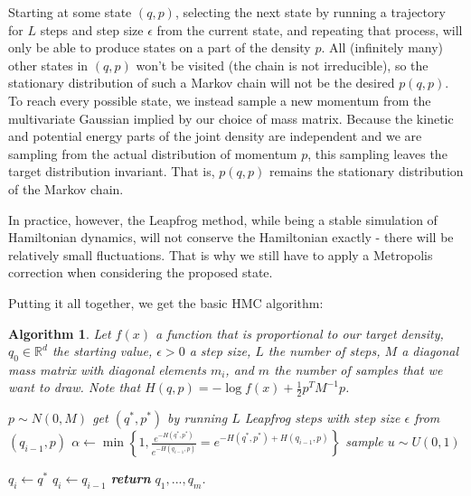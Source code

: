 \documentclass{book}
\theoremstyle{plain}%
\newtheorem{algo}{Algorithm}[section]
\theoremstyle{definition}
\begin{document}
Starting at some state $(q, p)$, selecting the next state by running a trajectory for $L$ steps and step size $\epsilon$ from the current state, and repeating that process, will only be able to produce states on a part of the density $p$. All (infinitely many) other states in $(q, p)$ won't be visited (the chain is not irreducible), so the stationary distribution of such a Markov chain will not be the desired $p(q, p)$. To reach every possible state, we instead sample a new momentum from the multivariate Gaussian implied by our choice of mass matrix. Because the kinetic and potential energy parts of the joint density are independent and we are sampling from the actual distribution of momentum $p$, this sampling leaves the target distribution invariant. That is, $p(q, p)$ remains the stationary distribution of the Markov chain.

In practice, however, the Leapfrog method, while being a stable simulation of Hamiltonian dynamics, will not conserve the Hamiltonian exactly - there will be relatively small fluctuations. That is why we still have to apply a Metropolis correction when considering the proposed state.

Putting it all together, we get the basic HMC algorithm:

\begin{algo}
Let $f(x)$ a function that is proportional to our target density, $q_0 \in \mathbb{R}^d$ the starting value, $\epsilon > 0$ a step size, $L$ the number of steps, $M$ a diagonal mass matrix with diagonal elements $m_i$, and $m$ the number of samples that we want to draw. Note that $H(q, p) = -\log f(x) + \frac{1}{2}p^T M^{-1}p$.
\begin{algorithmic}[1]
 
\State $p \sim N(0, M)$ 
\State get $(q^*, p^*)$ by running $L$ Leapfrog steps with step size $\epsilon$ from $(q_{i-1}, p)$
\State $\alpha \gets \min \left\lbrace 1, \frac{e^{-H(q^*, p^*)}}{e^{-H(q_{i-1}, p)}} = e^{-H(q^*, p^*) + H(q_{i-1}, p)}\right\rbrace$ 
\State sample $u \sim U(0,1)$

\State $q_i \gets q^*$ 
\Else
\State $q_i \gets q_{i-1}$
\EndIf
              \EndFor
              \State \textbf{return} $q_1,...,q_m$.
        \EndProcedure
    \end{algorithmic}\label{alg:bootstrap}
\end{algo}
\end{document}
